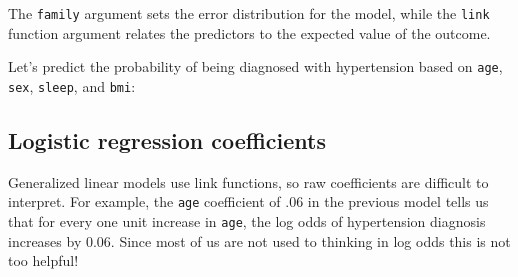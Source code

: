 \documentclass[]{book}
\newenvironment{Shaded}{\begin{snugshade}}{\end{snugshade}}
\newcommand{\KeywordTok}[1]{\textcolor[rgb]{0.13,0.29,0.53}{\textbf{#1}}}
\newcommand{\DataTypeTok}[1]{\textcolor[rgb]{0.13,0.29,0.53}{#1}}
\newcommand{\DecValTok}[1]{\textcolor[rgb]{0.00,0.00,0.81}{#1}}
\newcommand{\StringTok}[1]{\textcolor[rgb]{0.31,0.60,0.02}{#1}}
\newcommand{\CommentTok}[1]{\textcolor[rgb]{0.56,0.35,0.01}{\textit{#1}}}
\newcommand{\OperatorTok}[1]{\textcolor[rgb]{0.81,0.36,0.00}{\textbf{#1}}}
\newcommand{\NormalTok}[1]{#1}
\begin{document}
The \texttt{family} argument sets the error distribution for the model,
while the \texttt{link} function argument relates the predictors to the
expected value of the outcome.

Let's predict the probability of being diagnosed with hypertension based
on \texttt{age}, \texttt{sex}, \texttt{sleep}, and \texttt{bmi}:

\begin{Shaded}
\end{Shaded}

\subsection{Logistic regression
coefficients}\label{logistic-regression-coefficients}

Generalized linear models use link functions, so raw coefficients are
difficult to interpret. For example, the \texttt{age} coefficient of .06
in the previous model tells us that for every one unit increase in
\texttt{age}, the log odds of hypertension diagnosis increases by 0.06.
Since most of us are not used to thinking in log odds this is not too
helpful!
\end{document}
